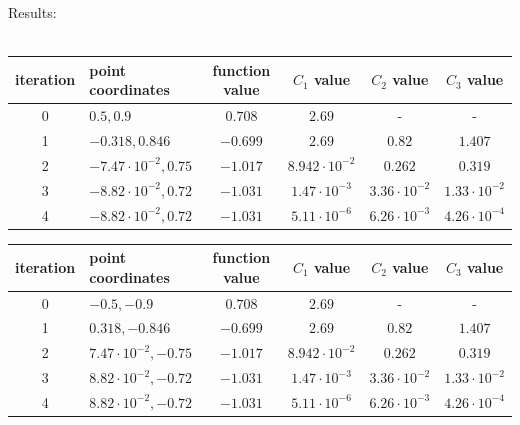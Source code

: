 \documentclass[12pt]{article}
\begin{document}
	\begin{table}[H]
		Results: \\\\
		\begin{tabularx}{\textwidth}{c|X|c|c|c|c|}
			iteration & point coordinates & function value & $C_1$ value & $C_2$ value & $C_3$ value\\
			\hline
			0 & $0.5, 0.9$ & $0.708$ & $2.69$ & - & - \\
			\hline
			1 & $-0.318, 0.846$ & $-0.699$ & $2.69$ & $0.82$ & $1.407$ \\
			\hline
			2 & $-7.47\cdot10^{-2}, 0.75$ & $-1.017$ & $8.942\cdot10^{-2}$ & $0.262$ & $0.319$ \\
			\hline
			3 & $-8.82\cdot10^{-2}, 0.72$ & $-1.031$ & $1.47\cdot10^{-3}$ & $3.36\cdot10^{-2}$ & $1.33\cdot10^{-2}$ 	\\
			\hline		
			4 & $-8.82\cdot10^{-2}, 0.72$ & $-1.031$ & $5.11\cdot10^{-6}$ & $6.26\cdot10^{-3}$ & $4.26\cdot10^{-4}$ 	\\
			\hline		
		\end{tabularx}	
	\end{table}	

	\begin{table}[H]
		\begin{tabularx}{\textwidth}{c|X|c|c|c|c|}
			iteration & point coordinates & function value & $C_1$ value & $C_2$ value & $C_3$ value\\
			\hline
			0 & $-0.5, -0.9$ & $0.708$ & $2.69$ & - & - \\
			\hline
			1 & $0.318, -0.846$ & $-0.699$ & $2.69$ & $0.82$ & $1.407$ \\
			\hline
			2 & $7.47\cdot10^{-2}, -0.75$ & $-1.017$ & $8.942\cdot10^{-2}$ & $0.262$ & $0.319$ \\
			\hline
			3 & $8.82\cdot10^{-2}, -0.72$ & $-1.031$ & $1.47\cdot10^{-3}$ & $3.36\cdot10^{-2}$ & $1.33\cdot10^{-2}$ 	\\
			\hline		
			4 & $8.82\cdot10^{-2}, -0.72$ & $-1.031$ & $5.11\cdot10^{-6}$ & $6.26\cdot10^{-3}$ & $4.26\cdot10^{-4}$ 	\\
			\hline		
		\end{tabularx}	
	\end{table}
	
\end{document}

